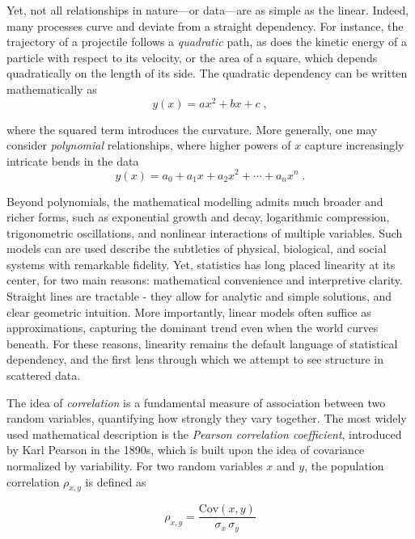 \documentclass{book}
\begin{document}
\medskip

Yet, not all relationships in nature—or data—are as simple as the linear. Indeed, many processes curve and deviate from a straight dependency. For instance, the trajectory of a projectile follows a \textit{quadratic} path, as does the kinetic energy of a particle with respect to its velocity, or the area of a square, which depends quadratically on the length of its side. The quadratic dependency can be written mathematically as
\begin{equation}
	y(x) = a x^2 + b x + c \; ,
	\label{eq:quadratic}
\end{equation}

where the squared term introduces the curvature. More generally, one may consider \textit{polynomial} relationships, where higher powers of $x$ capture increasingly intricate bends in the data
\begin{equation}
	y(x) = a_0 + a_1 x + a_2 x^2 + \cdots + a_n x^n \; .
	\label{eq:polynomial}
\end{equation}

Beyond polynomials, the mathematical modelling admits much broader and richer forms, such as exponential growth and decay, logarithmic compression, trigonometric oscillations, and nonlinear interactions of multiple variables. Such models can are used describe the subtleties of physical, biological, and social systems with remarkable fidelity. Yet, statistics has long placed linearity at its center, for two main reasons: mathematical convenience and interpretive clarity. Straight lines are tractable - they allow for analytic and simple solutions, and clear geometric intuition. More importantly, linear models often suffice as approximations, capturing the dominant trend even when the world curves beneath. For these reasons, linearity remains the default language of statistical dependency, and the first lens through which we attempt to see structure in scattered data.

\medskip

The idea of \textit{correlation} is a fundamental measure of association between two random variables, quantifying how strongly they vary together. The most widely used mathematical description is the \textit{Pearson correlation coefficient}, introduced by Karl Pearson in the 1890s, which is built upon the idea of covariance normalized by variability. For two random variables $x$ and $y$, the population correlation $\rho_{x, y}$ is defined as

\begin{equation}
    \rho_{x, y} = \frac{\mathrm{Cov}(x, y)}{\sigma_x \, \sigma_y}
    \label{eq:correlation}
\end{equation}
\end{document}
